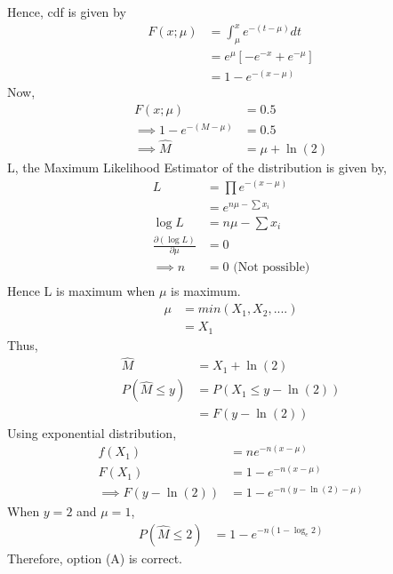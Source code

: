 \documentclass[]{article}
\begin{document}
Hence, cdf is given by
\begin{align}
F(x; \mu) &= \int_{\mu}^{x} e^{-(t-\mu)}dt\\ 
&= e^{\mu}[-e^{-x} + e^{-\mu}]\\
&= 1 - e^{-(x-\mu)}
\end{align}
Now,
\begin{align}
F(x; \mu) &= 0.5\\
\implies 1 - e^{-(M-\mu)} &= 0.5\\
\implies \hat{M} &= \mu + \ln(2)
\end{align}
L, the Maximum Likelihood Estimator of the distribution is given by,
\begin{align}
L &= \prod e^{-(x-\mu)}\\
&= e^{n\mu-\sum x_i}\\
\log L &= n\mu - \sum x_i\\
\frac{\partial {(\log L)}}{\partial \mu} &= 0\\
\implies n &= 0 \text{ (Not possible)}\\
\end{align}
Hence L is maximum when $\mu$ is maximum.
\begin{align}
\mu &= min(X_1, X_2,....)\\
&= X_1 
\end{align}
Thus,
\begin{align}
\hat{M} &= X_1 + \ln(2)\\
P(\hat{M} \leq y) &= P(X_1 \leq y-\ln(2))\\
&= F(y-\ln(2))
\end{align}
Using exponential distribution,
\begin{align}
f(X_1) &= ne^{-n(x-\mu)}\\
F(X_1) &= 1-e^{-n(x-\mu)}\\
\implies F(y-\ln(2)) &= 1-e^{-n(y-\ln(2)-\mu)}
\end{align}
When $y = 2$ and $\mu = 1$,
\begin{align}
P(\hat{M} \leq 2) &= 1 - e^{-n(1 - \log_e 2)}
\end{align}
Therefore, option (A) is correct.
\end{document}
